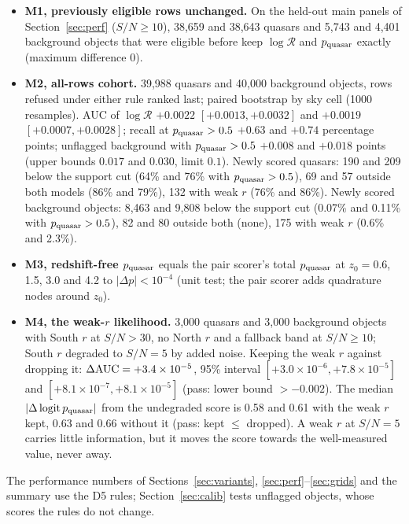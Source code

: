 \documentclass[11pt,a4paper]{article}
\newcommand{\R}{\mathcal{R}}
\begin{document}
\begin{itemize}
\item \textbf{M1, previously eligible rows unchanged.} On the held-out main panels of Section~\ref{sec:perf}
  ($S/N\geq10$), 38,659 and 38,643 quasars and 5,743 and 4,401 background objects that were eligible before keep
  $\log\R$ and $p_{\rm quasar}$ exactly (maximum difference 0).
\item \textbf{M2, all-rows cohort.} 39,988 quasars and 40,000 background objects, rows refused under either rule
  ranked last; paired bootstrap by sky cell (1000 resamples). AUC of $\log\R$ $+0.0022$ $[+0.0013,+0.0032]$ and
  $+0.0019$ $[+0.0007,+0.0028]$; recall at $p_{\rm quasar}>0.5$ $+0.63$ and $+0.74$ percentage points; unflagged
  background with $p_{\rm quasar}>0.5$ $+0.008$ and $+0.018$ points (upper bounds $0.017$ and $0.030$, limit
  $0.1$). Newly scored quasars: 190 and 209 below the support cut (64\% and 76\% with $p_{\rm quasar}>0.5$), 69
  and 57 outside both models (86\% and 79\%), 132 with weak $r$ (76\% and 86\%). Newly scored background
  objects: 8,463 and 9,808 below the support cut (0.07\% and 0.11\% with $p_{\rm quasar}>0.5$), 82 and 80
  outside both (none), 175 with weak $r$ (0.6\% and 2.3\%).
\item \textbf{M3, redshift-free $p_{\rm quasar}$} equals the pair scorer's total $p_{\rm quasar}$ at
  $z_0=0.6$, 1.5, 3.0 and 4.2 to $|\Delta p|<10^{-4}$ (unit test; the pair scorer adds quadrature nodes around $z_0$).
\item \textbf{M4, the weak-$r$ likelihood.} 3,000 quasars and 3,000 background objects with South $r$ at $S/N>30$,
  no North $r$ and a fallback band at $S/N\geq10$; South $r$ degraded to $S/N=5$ by added noise. Keeping the weak
  $r$ against dropping it: $\Delta{\rm AUC}=+3.4\times10^{-5}$, 95\% interval $[+3.0\times10^{-6},
  +7.8\times10^{-5}]$ and $[+8.1\times10^{-7},+8.1\times10^{-5}]$ (pass: lower bound $>-0.002$). The median
  $|\Delta\,{\rm logit}\,p_{\rm quasar}|$ from the undegraded score is 0.58 and 0.61 with the weak $r$ kept, 0.63
  and 0.66 without it (pass: kept $\leq$ dropped). A weak $r$ at $S/N=5$ carries little information, but it
  moves the score towards the well-measured value, never away.
\end{itemize}
The performance numbers of Sections~\ref{sec:variants}, \ref{sec:perf}--\ref{sec:grids} and the summary use the D5
rules; Section~\ref{sec:calib} tests unflagged objects, whose scores the rules do not change.

\end{document}
